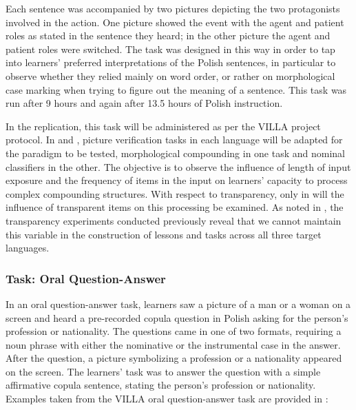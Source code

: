 \documentclass[output=paper,colorlinks,citecolor=brown,modfonts,nonflat]{../langscibook}
\begin{document}
Each sentence was accompanied by two pictures depicting the two protagonists involved in the action. One picture showed the event with the agent and patient roles as stated in the sentence they heard; in the other picture the agent and patient roles were switched. The task was designed in this way in order to tap into learners’ preferred interpretations of the Polish sentences, in particular to observe whether they relied mainly on word order, or rather on morphological case marking when trying to figure out the meaning of a sentence. This task was run after 9 hours and again after 13.5 hours of Polish instruction.

In the  replication, this task will be administered as per the VILLA project protocol. In  and , picture verification tasks in each language will be adapted for the paradigm to be tested, morphological compounding in one task and nominal classifiers in the other. The objective is to observe the influence of length of input exposure and the frequency of items in the input on learners’ capacity to process complex compounding structures. With respect to transparency, only in  will the influence of transparent items on this processing be examined. As noted in , the transparency experiments conducted previously reveal that we cannot maintain this variable in the construction of lessons and tasks across all three target languages.

\subsubsection{Task: Oral Question-Answer}

In an oral question-answer task, learners saw a picture of a man or a woman on a screen and heard a pre-recorded copula question in Polish asking for the person’s profession or nationality. The questions came in one of two formats, requiring a noun phrase with either the nominative or the instrumental case in the answer. After the question, a picture symbolizing a profession or a nationality appeared on the screen. The learners’ task was to answer the question with a simple affirmative copula sentence, stating the person’s profession or nationality. Examples taken from the VILLA oral question-answer task are provided in :

\end{document}
